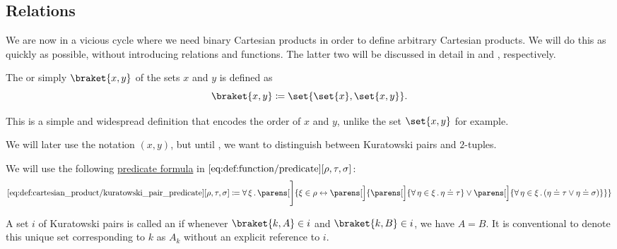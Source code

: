 \subsection{Relations}\label{subsec:relations}

\begin{definition}\label{def:cartesian_product}
  We are now in a vicious cycle where we need binary Cartesian products in order to define arbitrary Cartesian products. We will do this as quickly as possible, without introducing relations and functions. The latter two will be discussed in detail in  and , respectively.

  \begin{thmenum}
     The  or simply  \( \braket{ x, y } \) of the sets \( x \) and \( y \) is defined as
    \begin{equation*}
      \braket{ x, y } \coloneqq \set{ \set{ x }, \set{ x, y } }.
    \end{equation*}

    This is a simple and widespread definition that encodes the order of \( x \) and \( y \), unlike the set \( \set{ x, y } \) for example.

    We will later use the notation \( (x, y) \), but until , we want to distinguish between Kuratowski pairs and \( 2 \)-tuples.

    We will use the following \hyperref[rem:predicate_formula]{predicate formula} in \( \ref{eq:def:function/predicate}[\rho, \tau, \sigma] \):
    \begin{equation*}\taglabel[\op{IsPair}]{eq:def:cartesian_product/kuratowski_pair_predicate}
      \ref{eq:def:cartesian_product/kuratowski_pair_predicate}[\rho, \tau, \sigma] \coloneqq \qforall \xi \parens[\Bigg]{ \xi \in \rho \leftrightarrow \parens[\Big]{ \parens[\Big]{ \qforall {\eta \in \xi} \eta \doteq \tau } \vee \parens[\Big]{ \qforall {\eta \in \xi} (\eta \doteq \tau \vee \eta \doteq \sigma) } } }
    \end{equation*}

     A set \( i \) of Kuratowski pairs is called an  if whenever \( \braket{ k, A } \in i \) and \( \braket{ k, B } \in i \), we have \( A = B \). It is conventional to denote this unique set corresponding to \( k \) as \( A_k \) without an explicit reference to \( i \).


\end{thmenum}
\end{definition}
